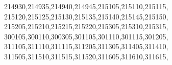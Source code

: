 \documentclass[
  12,
  dvipsnames]{article}
\newenvironment{Shaded}{\begin{snugshade}}{\end{snugshade}}
\newcommand{\NormalTok}[1]{#1}
\newcommand{\StringTok}[1]{\textcolor[rgb]{0.31,0.60,0.02}{#1}}
\begin{document}
\begin{Shaded}
\begin{Highlighting}[]
                  \StringTok{\textquotesingle{}214930\textquotesingle{}}\NormalTok{,}\StringTok{\textquotesingle{}214935\textquotesingle{}}\NormalTok{,}\StringTok{\textquotesingle{}214940\textquotesingle{}}\NormalTok{,}\StringTok{\textquotesingle{}214945\textquotesingle{}}\NormalTok{,}\StringTok{\textquotesingle{}215105\textquotesingle{}}\NormalTok{,}\StringTok{\textquotesingle{}215110\textquotesingle{}}\NormalTok{,}\StringTok{\textquotesingle{}215115\textquotesingle{}}\NormalTok{,}
                  \StringTok{\textquotesingle{}215120\textquotesingle{}}\NormalTok{,}\StringTok{\textquotesingle{}215125\textquotesingle{}}\NormalTok{,}\StringTok{\textquotesingle{}215130\textquotesingle{}}\NormalTok{,}\StringTok{\textquotesingle{}215135\textquotesingle{}}\NormalTok{,}\StringTok{\textquotesingle{}215140\textquotesingle{}}\NormalTok{,}\StringTok{\textquotesingle{}215145\textquotesingle{}}\NormalTok{,}\StringTok{\textquotesingle{}215150\textquotesingle{}}\NormalTok{,}
                  \StringTok{\textquotesingle{}215205\textquotesingle{}}\NormalTok{,}\StringTok{\textquotesingle{}215210\textquotesingle{}}\NormalTok{,}\StringTok{\textquotesingle{}215215\textquotesingle{}}\NormalTok{,}\StringTok{\textquotesingle{}215220\textquotesingle{}}\NormalTok{,}\StringTok{\textquotesingle{}215305\textquotesingle{}}\NormalTok{,}\StringTok{\textquotesingle{}215310\textquotesingle{}}\NormalTok{,}\StringTok{\textquotesingle{}215315\textquotesingle{}}\NormalTok{,}
                  \StringTok{\textquotesingle{}300105\textquotesingle{}}\NormalTok{,}\StringTok{\textquotesingle{}300110\textquotesingle{}}\NormalTok{,}\StringTok{\textquotesingle{}300305\textquotesingle{}}\NormalTok{,}\StringTok{\textquotesingle{}301105\textquotesingle{}}\NormalTok{,}\StringTok{\textquotesingle{}301110\textquotesingle{}}\NormalTok{,}\StringTok{\textquotesingle{}301115\textquotesingle{}}\NormalTok{,}\StringTok{\textquotesingle{}301205\textquotesingle{}}\NormalTok{,}
                  \StringTok{\textquotesingle{}311105\textquotesingle{}}\NormalTok{,}\StringTok{\textquotesingle{}311110\textquotesingle{}}\NormalTok{,}\StringTok{\textquotesingle{}311115\textquotesingle{}}\NormalTok{,}\StringTok{\textquotesingle{}311205\textquotesingle{}}\NormalTok{,}\StringTok{\textquotesingle{}311305\textquotesingle{}}\NormalTok{,}\StringTok{\textquotesingle{}311405\textquotesingle{}}\NormalTok{,}\StringTok{\textquotesingle{}311410\textquotesingle{}}\NormalTok{,}
                  \StringTok{\textquotesingle{}311505\textquotesingle{}}\NormalTok{,}\StringTok{\textquotesingle{}311510\textquotesingle{}}\NormalTok{,}\StringTok{\textquotesingle{}311515\textquotesingle{}}\NormalTok{,}\StringTok{\textquotesingle{}311520\textquotesingle{}}\NormalTok{,}\StringTok{\textquotesingle{}311605\textquotesingle{}}\NormalTok{,}\StringTok{\textquotesingle{}311610\textquotesingle{}}\NormalTok{,}\StringTok{\textquotesingle{}311615\textquotesingle{}}\NormalTok{,}

\end{Highlighting}
\end{Shaded}
\end{document}
